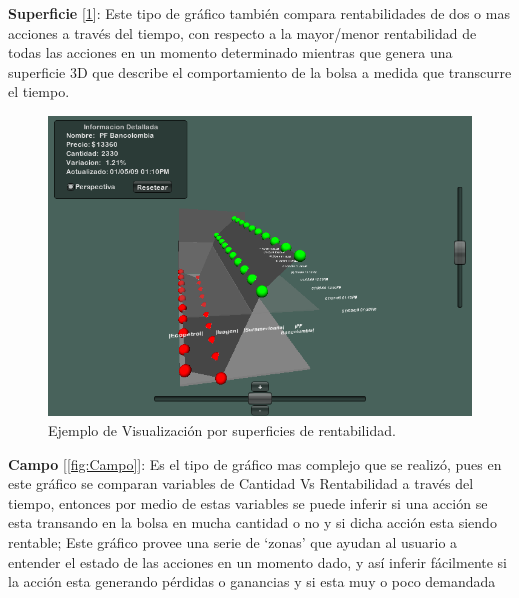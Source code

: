 \documentclass[twocolumn]{article}
\begin{document}
\textbf{Superficie} [\ref{fig:Superficie}]: Este tipo de gráfico también compara rentabilidades de dos o mas acciones a través del tiempo, con respecto a la mayor/menor rentabilidad de todas las acciones en un momento determinado  mientras que genera una superficie 3D que describe el comportamiento de la bolsa a medida que transcurre el tiempo.\\

\begin{figure}[h]
	\centering
		\includegraphics[scale=0.3]{Superficie.png}
		\caption{Ejemplo de Visualización por superficies de rentabilidad.}
	\label{fig:Superficie}
\end{figure}

\textbf{Campo} [\ref{fig:Campo}]: Es el tipo de gráfico mas complejo que se realizó, pues en este gráfico se comparan variables de Cantidad Vs Rentabilidad a través del tiempo\cite{383531}, entonces por medio de estas variables se puede inferir si una acción se esta transando en la bolsa en mucha cantidad o no y si dicha acción esta siendo rentable; Este gráfico provee una serie de `zonas' que ayudan al usuario a entender el estado de las acciones en un momento dado, y así inferir fácilmente si la acción esta generando pérdidas o ganancias y si esta muy o poco demandada\\
\end{document}
